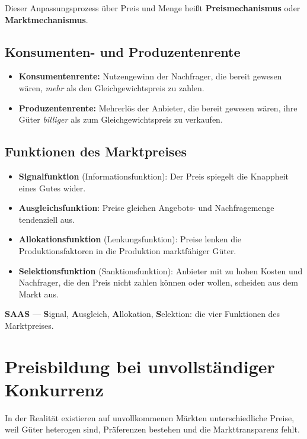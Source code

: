 \documentclass[11pt, a4paper]{article}
\begin{document}
Dieser Anpassungsprozess über Preis und Menge heißt \textbf{Preismechanismus} oder
\textbf{Marktmechanismus}.

\subsection{Konsumenten- und Produzentenrente}

\begin{itemize}
  \item \textbf{Konsumentenrente:} Nutzengewinn der Nachfrager, die bereit gewesen wären,
    \emph{mehr} als den Gleichgewichtspreis zu zahlen.
  \item \textbf{Produzentenrente:} Mehrerlös der Anbieter, die bereit gewesen wären, ihre
    Güter \emph{billiger} als zum Gleichgewichtspreis zu verkaufen.
\end{itemize}

\subsection{Funktionen des Marktpreises}

\begin{itemize}
  \item \textbf{Signalfunktion} (Informationsfunktion): Der Preis spiegelt die Knappheit
    eines Gutes wider.
  \item \textbf{Ausgleichsfunktion}: Preise gleichen Angebots- und Nachfragemenge
    tendenziell aus.
  \item \textbf{Allokationsfunktion} (Lenkungsfunktion): Preise lenken die
    Produktionsfaktoren in die Produktion marktfähiger Güter.
  \item \textbf{Selektionsfunktion} (Sanktionsfunktion): Anbieter mit zu hohen Kosten und
    Nachfrager, die den Preis nicht zahlen können oder wollen, scheiden aus dem Markt aus.
\end{itemize}

\begin{eselsbruecke}
\textbf{SAAS} --- \textbf{S}ignal, \textbf{A}usgleich, \textbf{A}llokation,
\textbf{S}elektion: die vier Funktionen des Marktpreises.
\end{eselsbruecke}

\section{Preisbildung bei unvollständiger Konkurrenz}

In der Realität existieren auf unvollkommenen Märkten unterschiedliche Preise, weil Güter
heterogen sind, Präferenzen bestehen und die Markttransparenz fehlt.
\end{document}
